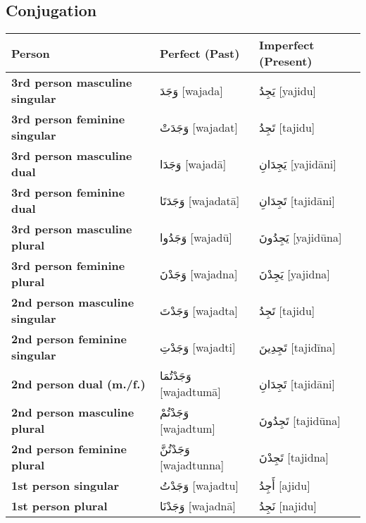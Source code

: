 \documentclass[letterpaper,12pt]{article}
\begin{document}
\subsection{Conjugation}
\begin{longtable}{|>{\raggedright}p{3.5cm}|p{5cm}|p{5cm}|}
\hline
\textbf{Person} & \textbf{Perfect (Past)} & \textbf{Imperfect (Present)} \\
\hline
\textbf{3rd person masculine singular} & \textarabic{وَجَدَ} [wajada] & \textarabic{يَجِدُ} [yajidu] \\
\hline
\textbf{3rd person feminine singular} & \textarabic{وَجَدَتْ} [wajadat] & \textarabic{تَجِدُ} [tajidu] \\
\hline
\textbf{3rd person masculine dual} & \textarabic{وَجَدَا} [wajadā] & \textarabic{يَجِدَانِ} [yajidāni] \\
\hline
\textbf{3rd person feminine dual} & \textarabic{وَجَدَتَا} [wajadatā] & \textarabic{تَجِدَانِ} [tajidāni] \\
\hline
\textbf{3rd person masculine plural} & \textarabic{وَجَدُوا} [wajadū] & \textarabic{يَجِدُونَ} [yajidūna] \\
\hline
\textbf{3rd person feminine plural} & \textarabic{وَجَدْنَ} [wajadna] & \textarabic{يَجِدْنَ} [yajidna] \\
\hline
\textbf{2nd person masculine singular} & \textarabic{وَجَدْتَ} [wajadta] & \textarabic{تَجِدُ} [tajidu] \\
\hline
\textbf{2nd person feminine singular} & \textarabic{وَجَدْتِ} [wajadti] & \textarabic{تَجِدِينَ} [tajidīna] \\
\hline
\textbf{2nd person dual (m./f.)} & \textarabic{وَجَدْتُمَا} [wajadtumā] & \textarabic{تَجِدَانِ} [tajidāni] \\
\hline
\textbf{2nd person masculine plural} & \textarabic{وَجَدْتُمْ} [wajadtum] & \textarabic{تَجِدُونَ} [tajidūna] \\
\hline
\textbf{2nd person feminine plural} & \textarabic{وَجَدْتُنَّ} [wajadtunna] & \textarabic{تَجِدْنَ} [tajidna] \\
\hline
\textbf{1st person singular} & \textarabic{وَجَدْتُ} [wajadtu] & \textarabic{أَجِدُ} [ajidu] \\
\hline
\textbf{1st person plural} & \textarabic{وَجَدْنَا} [wajadnā] & \textarabic{نَجِدُ} [najidu] \\
\hline
\end{longtable}
\end{document}
